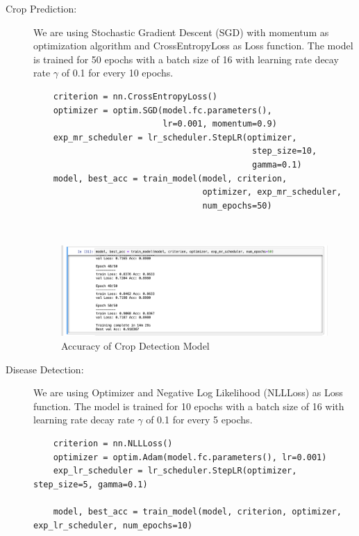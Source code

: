\documentclass[../Report.tex]{subfiles}
\begin{document}
\begin{description}
  \item[Crop Prediction:] We are using Stochastic Gradient Descent (SGD) with momentum as optimization algorithm and CrossEntropyLoss as 
  Loss function. The model is trained for 50 epochs with a batch size of 16 with learning rate decay rate $\gamma$ of 0.1 for every 10 epochs.

  \begin{verbatim}
    criterion = nn.CrossEntropyLoss()
    optimizer = optim.SGD(model.fc.parameters(), 
                          lr=0.001, momentum=0.9)
    exp_mr_scheduler = lr_scheduler.StepLR(optimizer, 
                                            step_size=10, 
                                            gamma=0.1)
    model, best_acc = train_model(model, criterion, 
                                  optimizer, exp_mr_scheduler, 
                                  num_epochs=50)
  \end{verbatim}
   ~\par

  \begin{figure}[H]
    \centering
    \includegraphics[width=\linewidth]{images/crop_acc.png}
    \caption{Accuracy of Crop Detection Model}
    \label{fig:crop_acc}
  \end{figure}

  \item[Disease Detection:] We are using \cite{adam} Optimizer and Negative Log Likelihood (NLLLoss) as Loss function. The model is trained for 
  10 epochs with a batch size of 16 with learning rate decay rate $\gamma$ of 0.1 for every 5 epochs.
  
  \begin{verbatim}
    criterion = nn.NLLLoss()
    optimizer = optim.Adam(model.fc.parameters(), lr=0.001)
    exp_lr_scheduler = lr_scheduler.StepLR(optimizer, step_size=5, gamma=0.1)
    
    model, best_acc = train_model(model, criterion, optimizer, exp_lr_scheduler, num_epochs=10) 
  \end{verbatim}
   ~\par


\end{description}
\end{document}
